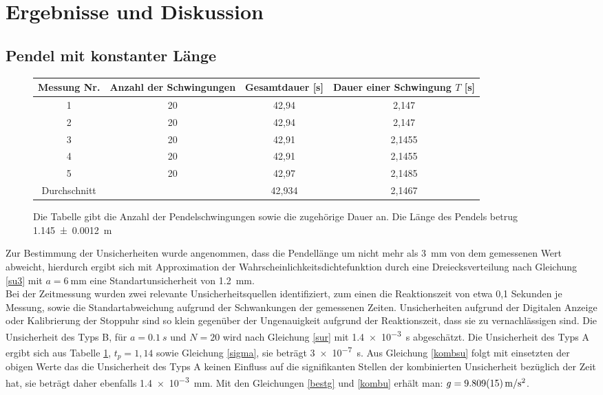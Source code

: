 

\section{Ergebnisse und Diskussion}


\subsection{Pendel mit konstanter Länge}


\begin{figure}[h]


\begin{tabular}{|c||c|c|c|}
\hline
Messung Nr. & Anzahl der Schwingungen & Gesamtdauer [s] & Dauer einer Schwingung $T$ [s] \\ \hline \hline
1&	20&	42,94&	2,147	\\ \hline
2&	20&	42,94&	2,147	\\ \hline
3&	20&	42,91&	2,1455	\\ \hline
4&	20&	42,91&	2,1455	\\	\hline
5&	20&	42,97&	2,1485	\\ \hline
Durchschnitt&&42,934&2,1467	\\ \hline


	
\end{tabular}
\caption{Die Tabelle gibt die Anzahl der Pendelschwingungen sowie die zugehörige Dauer an. Die Länge des Pendels betrug \SI{1,145+-0,0012} {\m}}
\label{lkonst}

\end{figure}

Zur Bestimmung der Unsicherheiten wurde angenommen, dass die Pendellänge um nicht mehr als \SI{3}{\mm} von dem gemessenen Wert abweicht, hierdurch ergibt sich mit Approximation der Wahrscheinlichkeitsdichtefunktion durch eine Dreiecksverteilung nach Gleichung \ref{su3} mit $a=\SI{6}{\mm}$ eine Standartunsicherheit von \SI{1,2}{mm}. \\


Bei der Zeitmessung wurden zwei relevante Unsicherheitsquellen identifiziert, zum einen die Reaktionszeit von etwa 0,1 Sekunden je Messung, sowie die Standartabweichung aufgrund der Schwankungen der gemessenen Zeiten. Unsicherheiten aufgrund der Digitalen Anzeige oder Kalibrierung der Stoppuhr sind so klein gegenüber der Ungenauigkeit aufgrund der Reaktionszeit, dass sie zu vernachlässigen sind.
 Die Unsicherheit des Typs B, für  $a=\SI{0,1}{s} $ und $N=20$ wird nach Gleichung \ref{sur} mit \SI{1,4e-3}{\s} abgeschätzt. Die Unsicherheit des Typs A ergibt sich aus Tabelle \ref{lkonst}, $t_p=1,14$ sowie Gleichung \ref{sigma}, sie beträgt \SI{3e-7}{s}. Aus Gleichung \ref{kombsu} folgt mit einsetzten der obigen Werte das die Unsicherheit des Typs A keinen Einfluss  auf die signifikanten Stellen der kombinierten Unsicherheit bezüglich der Zeit hat, sie beträgt daher ebenfalls \SI{1,4e-3}{mm}.
Mit den Gleichungen \ref{bestg} und \ref{kombu} erhält man: $g=\SI{9,809+-0,015}{m/s^2}$.





